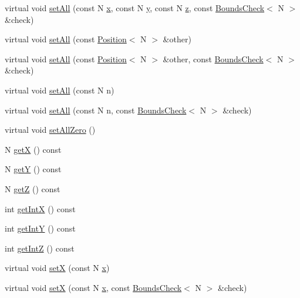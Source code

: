 \begin{DoxyCompactItemize}
\item 
virtual void \hyperlink{struct_position_abecde70eb2df3f274e171a06386feb4c}{set\-All} (const N \hyperlink{struct_position_af908be922fc88d89d81be7d08d06f761}{x}, const N \hyperlink{struct_position_af434f54a0aad8bbfc3806ebdd197aa3b}{y}, const N \hyperlink{struct_position_ac430da98504c2d4fd685c0363d728474}{z}, const \hyperlink{struct_bounds_check}{Bounds\-Check}$<$ N $>$ \&check)
\item 
virtual void \hyperlink{struct_position_a03ff8fcf39be2dc2ac547b9849a03fd6}{set\-All} (const \hyperlink{struct_position}{Position}$<$ N $>$ \&other)
\item 
virtual void \hyperlink{struct_position_ae7ad6637ca006d95867059c5405c2fdc}{set\-All} (const \hyperlink{struct_position}{Position}$<$ N $>$ \&other, const \hyperlink{struct_bounds_check}{Bounds\-Check}$<$ N $>$ \&check)
\item 
virtual void \hyperlink{struct_position_a90a919f4e1d7cdd0fcc50101d4c9dbd0}{set\-All} (const N n)
\item 
virtual void \hyperlink{struct_position_ae27c3958d1827450e434a8b2bb4d1092}{set\-All} (const N n, const \hyperlink{struct_bounds_check}{Bounds\-Check}$<$ N $>$ \&check)
\item 
virtual void \hyperlink{struct_position_ad625d6ef1db5f72883c6e2834f7cae81}{set\-All\-Zero} ()
\item 
N \hyperlink{struct_position_a7d1262a6b6f63f04c605bebf93a1f068}{get\-X} () const 
\item 
N \hyperlink{struct_position_a71d93e9a234bc4f32a61781c4e88bc10}{get\-Y} () const 
\item 
N \hyperlink{struct_position_a1d1171c9049c9a24be31bdb40e8662c0}{get\-Z} () const 
\item 
int \hyperlink{struct_position_a7c5b646e881251041b2373b0b9ee235b}{get\-Int\-X} () const 
\item 
int \hyperlink{struct_position_a2ddf4656749e96c1ad4bfec272521364}{get\-Int\-Y} () const 
\item 
int \hyperlink{struct_position_a41e19d862bf29d4aef2e25fbdd58f6b2}{get\-Int\-Z} () const 
\item 
virtual void \hyperlink{struct_position_a8ff94b86d9853ec1323129e2864a2f8d}{set\-X} (const N \hyperlink{struct_position_af908be922fc88d89d81be7d08d06f761}{x})
\item 
virtual void \hyperlink{struct_position_af1ca6db4823de1c43f874e72ce2b9b66}{set\-X} (const N \hyperlink{struct_position_af908be922fc88d89d81be7d08d06f761}{x}, const \hyperlink{struct_bounds_check}{Bounds\-Check}$<$ N $>$ \&check)

\end{DoxyCompactItemize}
